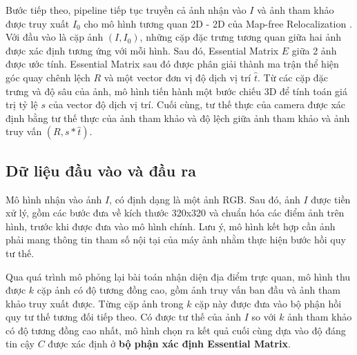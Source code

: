 Bước tiếp theo, pipeline tiếp tục truyền cả ảnh nhận vào $I$ và ảnh tham khảo được truy xuất $I_0$ cho mô hình tương quan 2D - 2D của Map-free Relocalization \cite{arnold2022mapfree}. Với đầu vào là cặp ảnh $(I, I_0)$, những cặp đặc trưng tương quan giữa hai ảnh được xác định tương ứng với mỗi hình. Sau đó, Essential Matrix $E$ giữa 2 ảnh được ước tính. Essential Matrix sau đó được phân giải thành ma trận thể hiện góc quay chênh lệch $R$ và một vector đơn vị độ dịch vị trí $\hat{t}$. Từ các cặp đặc trưng và độ sâu của ảnh, mô hình tiến hành một bước chiếu 3D để tính toán giá trị tỷ lệ $s$ của vector độ dịch vị trí. Cuối cùng, tư thế thực của camera được xác định bằng tư thế thực của ảnh tham khảo và độ lệch giữa ảnh tham khảo và ảnh truy vấn $(R,s*\hat{t})$.

\subsection{Dữ liệu đầu vào và đầu ra}
Mô hình nhận vào ảnh $I$, có định dạng là một ảnh RGB. Sau đó, ảnh $I$ được tiền xử lý, gồm các bước đưa về kích thước 320x320 và chuẩn hóa các điểm ảnh trên hình, trước khi được đưa vào mô hình chính. Lưu ý, mô hình kết hợp cần ảnh phải mang thông tin tham số nội tại của máy ảnh nhằm thực hiện bước hồi quy tư thế.

Qua quá trình mô phỏng lại bài toán nhận diện địa điểm trực quan, mô hình thu được $k$ cặp ảnh có độ tương đồng cao, gồm ảnh truy vấn ban đầu và ảnh tham khảo truy xuất được. Từng cặp ảnh trong $k$ cặp này được đưa vào bộ phận hồi quy tư thế tương đối tiếp theo. Có được tư thế của ảnh $I$ so với $k$ ảnh tham khảo có độ tương đồng cao nhất, mô hình chọn ra kết quả cuối cùng dựa vào độ đáng tin cậy $C$ được xác định ở \textbf{bộ phận xác định Essential Matrix}.

